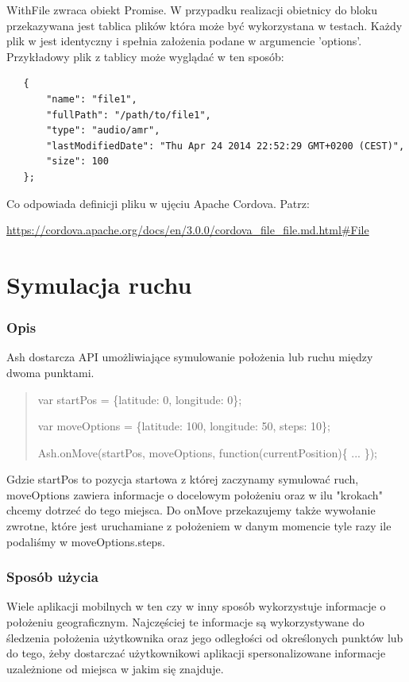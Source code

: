 \documentclass[brudnopis]{xmgr}
\begin{document}
WithFile zwraca obiekt Promise. W przypadku realizacji obietnicy do bloku przekazywana jest tablica plików która może być wykorzystana w testach. Każdy plik w jest identyczny i spełnia założenia podane w argumencie 'options'. Przykładowy plik z tablicy może wyglądać w ten sposób:

\begin{lstlisting}
   {
       "name": "file1",
       "fullPath": "/path/to/file1",
       "type": "audio/amr",
       "lastModifiedDate": "Thu Apr 24 2014 22:52:29 GMT+0200 (CEST)",
       "size": 100
   };
\end{lstlisting}

Co odpowiada definicji pliku w ujęciu Apache Cordova. Patrz:

\url{https://cordova.apache.org/docs/en/3.0.0/cordova_file_file.md.html#File}

\section{Symulacja ruchu}

\subsubsection{Opis}
Ash dostarcza API umożliwiające symulowanie położenia lub ruchu między dwoma punktami.

\begin{quote}
var startPos = \{latitude: 0, longitude: 0\};

var moveOptions = \{latitude: 100, longitude: 50, steps: 10\};

Ash.onMove(startPos, moveOptions, function(currentPosition)\{ ... \});
\end{quote}

Gdzie startPos to pozycja startowa z której zaczynamy symulować ruch, moveOptions zawiera informacje o docelowym położeniu oraz w ilu "krokach" chcemy dotrzeć do tego miejsca. Do onMove przekazujemy także wywołanie zwrotne, które jest uruchamiane z  położeniem w danym momencie tyle razy ile podaliśmy w moveOptions.steps. 

\subsubsection{Sposób użycia}

Wiele aplikacji mobilnych w ten czy w inny sposób wykorzystuje informacje o położeniu geograficznym. Najczęściej te informacje są wykorzystywane do śledzenia położenia użytkownika oraz jego odległości od określonych punktów lub do tego, żeby dostarczać użytkownikowi aplikacji spersonalizowane informacje uzależnione od miejsca w jakim się znajduje. 
\end{document}
